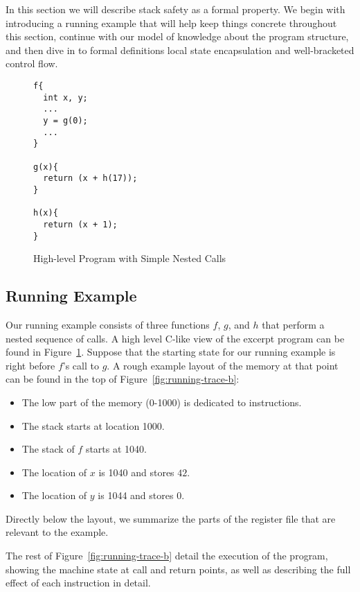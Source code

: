 \documentclass[acmsmall,review,anonymous]{acmart}\settopmatter{printfolios=true,printccs=false,printacmref=false}
\begin{document}
In this section we will describe stack safety as a formal property. We
begin with introducing a running example that will help keep things
concrete throughout this section, continue with our model of
 knowledge about the program structure, and
then dive in to formal definitions local state encapsulation and
well-bracketed control flow.

\begin{figure}[b]
  \begin{centering}
    \begin{minipage}{0.5\textwidth}
\begin{verbatim}
f{
  int x, y;
  ...
  y = g(0);
  ...
}

g(x){
  return (x + h(17));
}

h(x){
  return (x + 1);
}
\end{verbatim}
\end{minipage}
\end{centering}
\caption{High-level Program with Simple Nested Calls}
\label{fig:running-program}
\end{figure}

\subsection{Running Example}

Our running example consists of three functions $f$, $g$, and $h$ that
perform a nested sequence of calls. A high level C-like view of the
excerpt program can be found in Figure~\ref{fig:running-program}.
Suppose that the starting state for our running example is right
before $f$'s call to $g$. A rough example layout of the memory at that
point can be found in the top of Figure~\ref{fig:running-trace-b}:
\begin{itemize}
\item The low part of the memory (0-1000) is dedicated to instructions.
\item The stack starts at location 1000.
\item The stack of $f$ starts at 1040.
\item The location of $x$ is 1040 and stores $42$.
\item The location of $y$ is 1044 and stores $0$.
\end{itemize}
Directly below the layout, we summarize the parts of the register file
that are relevant to the example.

The rest of Figure~\ref{fig:running-trace-b} detail the execution of the
program, showing the machine state at call and return points, as well
as describing the full effect of each instruction in detail.
\end{document}
